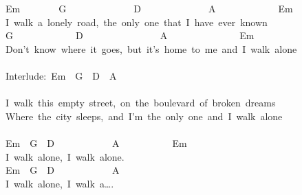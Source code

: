\documentclass[]{book}
\begin{document}
Em~~~~~~~~G~~~~~~~~~~~~~~D~~~~~~~~~~~~~~A~~~~~~~~~~~~~Em\\
I~walk~a~lonely~road,~the~only~one~that~I~have~ever~known\\
\hspace*{0.333em}\hspace*{0.333em}\hspace*{0.333em}\hspace*{0.333em}\hspace*{0.333em}\hspace*{0.333em}\hspace*{0.333em}\hspace*{0.333em}\hspace*{0.333em}\hspace*{0.333em}\hspace*{0.333em}\hspace*{0.333em}G~~~~~~~~~~~~~D~~~~~~~~~~~~~~~~A~~~~~~~~~~~~~~~Em\\
Don't~know~where~it~goes,~but~it's~home~to~me~and~I~walk~alone\\
~\\
Interlude:~Em~~G~~D~~A\\
~\\
I~walk~this~empty~street,~on~the~boulevard~of~broken~dreams\\
Where~the~city~sleeps,~and~I'm~the~only~one~and~I~walk~alone\\
~\\
Em~~G~~D~~~~~~~~~~~~A~~~~~~~~~~~Em\\
\hspace*{0.333em}\hspace*{0.333em}\hspace*{0.333em}\hspace*{0.333em}\hspace*{0.333em}\hspace*{0.333em}\hspace*{0.333em}\hspace*{0.333em}\hspace*{0.333em}\hspace*{0.333em}\hspace*{0.333em}\hspace*{0.333em}I~walk~alone,~I~walk~alone.\\
Em~~G~~D~~~~~~~~~~~~A\\
\hspace*{0.333em}\hspace*{0.333em}\hspace*{0.333em}\hspace*{0.333em}\hspace*{0.333em}\hspace*{0.333em}\hspace*{0.333em}\hspace*{0.333em}\hspace*{0.333em}\hspace*{0.333em}\hspace*{0.333em}\hspace*{0.333em}I~walk~alone,~I~walk~a\ldots.\\
\end{document}
